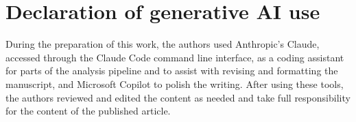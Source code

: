 \documentclass[
  british,
]{interact}
\begin{document}
\section*{Declaration of generative AI
use}\label{declaration-of-generative-ai-use}

During the preparation of this work, the authors used Anthropic's
Claude, accessed through the Claude Code command line interface, as a
coding assistant for parts of the analysis pipeline and to assist with
revising and formatting the manuscript, and Microsoft Copilot to polish
the writing. After using these tools, the authors reviewed and edited
the content as needed and take full responsibility for the content of
the published article.

\newpage



\end{document}

